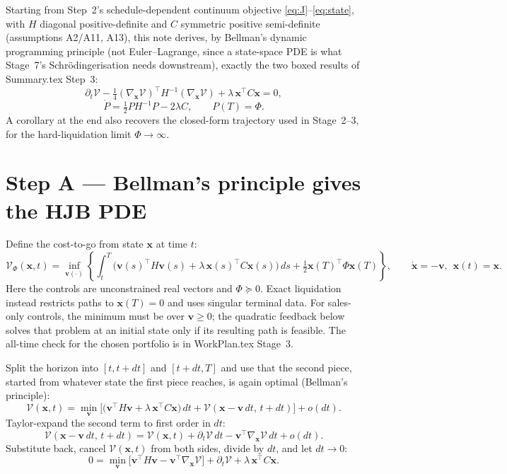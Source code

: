 \documentclass[11pt,a4paper]{article}
\begin{document}
Starting from Step~2's schedule-dependent continuum objective
\eqref{eq:J}--\eqref{eq:state},
with $H$ diagonal positive-definite and $C$ symmetric positive semi-definite
(assumptions A2/A11, A13), this note derives, by Bellman's dynamic
programming principle (not Euler--Lagrange, since a state-space PDE is what
Stage~7's Schr\"odingerisation needs downstream), exactly the two boxed
results of Summary.tex Step~3:
\begin{equation}
\partial_t\mathcal V-\tfrac14(\nabla_{\mathbf x}\mathcal V)^\top H^{-1}
(\nabla_{\mathbf x}\mathcal V)+\lambda\,\mathbf x^\top C\mathbf x=0,
\label{eq:hjb}
\end{equation}
\begin{equation}
\dot P=\tfrac12PH^{-1}P-2\lambda C,\qquad P(T)=\Phi.
\label{eq:ric}
\end{equation}
A corollary at the end also recovers the closed-form trajectory used in
Stage~2--3, for the hard-liquidation limit $\Phi\to\infty$.

\section*{Step A --- Bellman's principle gives the HJB PDE}

Define the cost-to-go from state $\mathbf x$ at time $t$:
\[
\mathcal V_\Phi(\mathbf x,t)=\inf_{\mathbf v(\cdot)}\left\{\int_t^T\big(\mathbf
v(s)^\top H\mathbf v(s)+\lambda\,\mathbf x(s)^\top C\mathbf x(s)\big)\,ds
+\tfrac12\mathbf x(T)^\top\Phi\mathbf x(T)\right\},
\qquad \dot{\mathbf x}=-\mathbf v,\ \ \mathbf x(t)=\mathbf x .
\]
Here the controls are unconstrained real vectors and $\Phi\succeq0$.
Exact liquidation instead restricts paths to $\mathbf x(T)=0$ and uses
singular terminal data. For sales-only controls, the minimum must be over
$\mathbf v\ge0$; the quadratic feedback below solves that problem at an
initial state only if its resulting path is feasible. The all-time check
for the chosen portfolio is in WorkPlan.tex Stage~3.

Split the horizon into $[t,t+dt]$ and $[t+dt,T]$ and use that the second
piece, started from whatever state the first piece reaches, is again optimal
(Bellman's principle):
\[
\mathcal V(\mathbf x,t)=\min_{\mathbf v}\Big[\big(\mathbf v^\top H\mathbf
v+\lambda\,\mathbf x^\top C\mathbf x\big)\,dt+\mathcal V(\mathbf x-\mathbf
v\,dt,\,t+dt)\Big]+o(dt).
\]
Taylor-expand the second term to first order in $dt$:
\[
\mathcal V(\mathbf x-\mathbf v\,dt,\,t+dt)=\mathcal V(\mathbf x,t)+\partial_t
\mathcal V\,dt-\mathbf v^\top\nabla_{\mathbf x}\mathcal V\,dt+o(dt).
\]
Substitute back, cancel $\mathcal V(\mathbf x,t)$ from both sides, divide by
$dt$, and let $dt\to0$:
\begin{equation}
0=\min_{\mathbf v}\Big[\mathbf v^\top H\mathbf v-\mathbf
v^\top\nabla_{\mathbf x}\mathcal V\Big]+\partial_t\mathcal V+\lambda\,\mathbf
x^\top C\mathbf x.
\label{eq:pre-hjb}
\end{equation}
\end{document}
